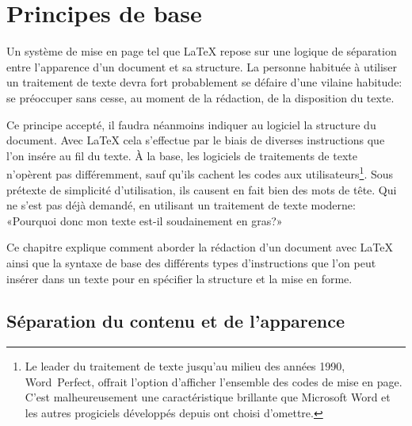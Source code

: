 \chapter{Principes de base}
\label{chap:bases}

Un système de mise en page tel que {\LaTeX} repose sur une logique de
séparation entre l'apparence d'un document et sa structure. La
personne habituée à utiliser un traitement de texte devra fort
probablement se défaire d'une vilaine habitude: se préoccuper sans
cesse, au moment de la rédaction, de la disposition du texte.

Ce principe accepté, il faudra néanmoins indiquer au logiciel la
structure du document. Avec {\LaTeX} cela s'effectue par le biais de
diverses instructions que l'on insére au fil du texte. À la base, les
logiciels de traitements de texte n'opèrent pas différemment, sauf
qu'ils cachent les codes aux utilisateurs\footnote{%
  Le leader du traitement de texte jusqu'au milieu des années 1990,
  Word~Perfect, offrait l'option d'afficher l'ensemble des codes de
  mise en page. C'est malheureusement une caractéristique brillante
  que Microsoft Word et les autres progiciels développés depuis ont
  choisi d'omettre.}. %
Sous prétexte de simplicité d'utilisation, ils causent en fait bien
des mots de tête. Qui ne s'est pas déjà demandé, en utilisant un
traitement de texte moderne: «Pourquoi donc mon texte est-il
soudainement en gras?»

Ce chapitre explique comment aborder la rédaction d'un document avec
{\LaTeX} ainsi que la syntaxe de base des différents types
d'instructions que l'on peut insérer dans un texte pour en spécifier
la structure et la mise en forme.


\section{Séparation du contenu et de l'apparence}
\label{sec:bases:separation}

